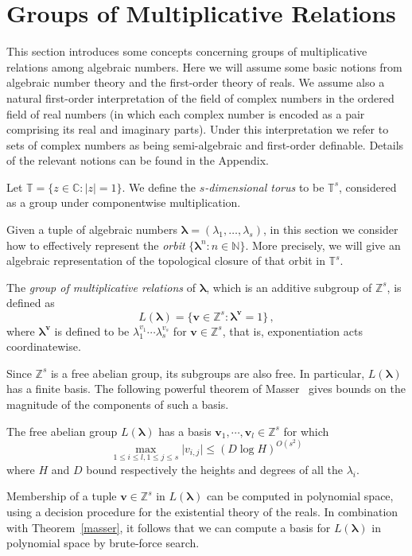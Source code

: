 \section{Groups of Multiplicative Relations}
\label{sec:mult}

This section introduces some concepts concerning groups of
multiplicative relations among algebraic numbers.  Here we will assume
some basic notions from algebraic number theory and the first-order
theory of reals.  We assume also a natural first-order interpretation of
the field of complex numbers in the ordered field of real numbers (in
which each complex number is encoded as a pair comprising its real and
imaginary parts).  Under this interpretation we refer to sets of
complex numbers as being semi-algebraic and first-order definable.
Details of the relevant notions can be found in the Appendix.

Let $\mathbb{T}=\lbrace z\in\mathbb{C}: \lvert z\rvert =1\rbrace$.  We
define the \emph{$s$-dimensional torus} to be $\mathbb{T}^s$,
considered as a group under componentwise multiplication.

Given a tuple of algebraic numbers
$\boldsymbol\lambda=(\lambda_1,\ldots,\lambda_s)$, in this section we
consider how to effectively represent the \emph{orbit} $\{
\boldsymbol\lambda^n : n \in \mathbb{N}\}$.  More
precisely, we will give an algebraic representation of the topological
closure of that orbit in $\mathbb{T}^s$.

The \emph{group of multiplicative relations} of
$\boldsymbol{\lambda}$, which is an additive subgroup of
$\mathbb{Z}^s$, is defined as
\begin{equation*}
L(\boldsymbol{\lambda})=\lbrace \boldsymbol{v}\in \mathbb{Z}^s : \boldsymbol\lambda^{\boldsymbol v}=1 \rbrace \, ,
\end{equation*}
where $\boldsymbol\lambda^{\boldsymbol v}$ is defined to be
$\lambda_1^{v_1}\cdots\lambda_s^{v_s}$ for $\boldsymbol{v}\in \mathbb{Z}^s$, that is, exponentiation acts
coordinatewise.

Since $\mathbb{Z}^s$ is a free abelian group, its subgroups are also
free.  In particular, $L(\boldsymbol\lambda)$ has a finite basis. The
following powerful theorem of Masser~\cite{Mas88} gives bounds on the
magnitude of the components of such a basis.

\begin{theorem}[Masser]
\label{masser}
The free abelian group $L(\boldsymbol{\lambda})$ has a basis $\boldsymbol{v}_1,\cdots,\boldsymbol{v}_l\in\mathbb{Z}^s$ for which
\[ \max\limits_{1\leq i\leq l,1\leq j\leq s} \lvert v_{i,j} \rvert \leq (D\log H)^{O(s^2)} \]
where $H$ and $D$ bound respectively the heights and degrees of all the $\lambda_i$.
\end{theorem}
Membership of a tuple $\boldsymbol{v}\in \mathbb{Z}^s$ in
$L(\boldsymbol{\lambda})$ can be computed in polynomial space, using a
decision procedure for the existential theory of the reals.  In
combination with Theorem~\ref{masser}, it follows that we can compute
a basis for $L(\boldsymbol{\lambda})$ in polynomial space by
brute-force search.

